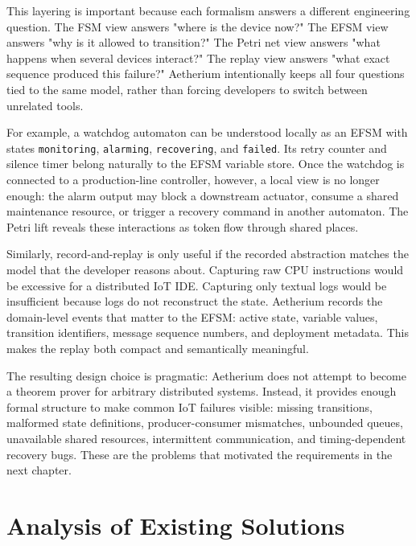 This layering is important because each formalism answers a different engineering question. The FSM view answers "where is the device now?" The EFSM view answers "why is it allowed to transition?" The Petri net view answers "what happens when several devices interact?" The replay view answers "what exact sequence produced this failure?" Aetherium intentionally keeps all four questions tied to the same model, rather than forcing developers to switch between unrelated tools.

For example, a watchdog automaton can be understood locally as an EFSM with states \texttt{monitoring}, \texttt{alarming}, \texttt{recovering}, and \texttt{failed}. Its retry counter and silence timer belong naturally to the EFSM variable store. Once the watchdog is connected to a production-line controller, however, a local view is no longer enough: the alarm output may block a downstream actuator, consume a shared maintenance resource, or trigger a recovery command in another automaton. The Petri lift reveals these interactions as token flow through shared places.

Similarly, record-and-replay is only useful if the recorded abstraction matches the model that the developer reasons about. Capturing raw CPU instructions would be excessive for a distributed IoT IDE. Capturing only textual logs would be insufficient because logs do not reconstruct the state. Aetherium records the domain-level events that matter to the EFSM: active state, variable values, transition identifiers, message sequence numbers, and deployment metadata. This makes the replay both compact and semantically meaningful.

The resulting design choice is pragmatic: Aetherium does not attempt to become a theorem prover for arbitrary distributed systems. Instead, it provides enough formal structure to make common IoT failures visible: missing transitions, malformed state definitions, producer-consumer mismatches, unbounded queues, unavailable shared resources, intermittent communication, and timing-dependent recovery bugs. These are the problems that motivated the requirements in the next chapter.

\chapter{Analysis of Existing Solutions}
\label{chap:analysis}

